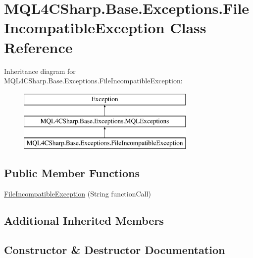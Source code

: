 \hypertarget{class_m_q_l4_c_sharp_1_1_base_1_1_exceptions_1_1_file_incompatible_exception}{}\section{M\+Q\+L4\+C\+Sharp.\+Base.\+Exceptions.\+File\+Incompatible\+Exception Class Reference}
\label{class_m_q_l4_c_sharp_1_1_base_1_1_exceptions_1_1_file_incompatible_exception}
Inheritance diagram for M\+Q\+L4\+C\+Sharp.\+Base.\+Exceptions.\+File\+Incompatible\+Exception\+:\begin{figure}[H]
\begin{center}
\leavevmode
\includegraphics[height=3.000000cm]{class_m_q_l4_c_sharp_1_1_base_1_1_exceptions_1_1_file_incompatible_exception}
\end{center}
\end{figure}
\subsection*{Public Member Functions}
\begin{DoxyCompactItemize}
\item 
\hyperlink{class_m_q_l4_c_sharp_1_1_base_1_1_exceptions_1_1_file_incompatible_exception_aa64e27382ee68d2f3902b854c5ab180f}{File\+Incompatible\+Exception} (String function\+Call)
\end{DoxyCompactItemize}
\subsection*{Additional Inherited Members}


\subsection{Constructor \& Destructor Documentation}
